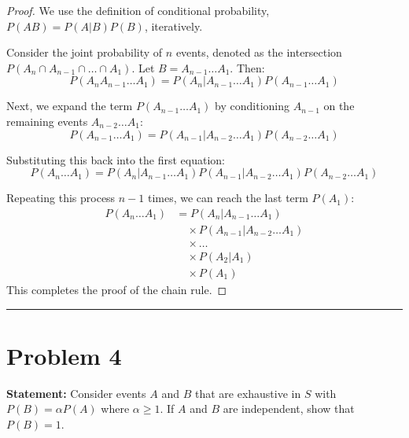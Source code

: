 \documentclass{article}
\begin{document}
\begin{proof}
	We use the definition of conditional probability, $P(AB) = P(A|B)P(B)$, iteratively.

	Consider the joint probability of $n$ events, denoted as the intersection $P(A_n \cap A_{n-1} \cap \dots \cap A_1)$.
	Let $B = A_{n-1} \dots A_1$. Then:
	\[ P(A_n A_{n-1} \dots A_1) = P(A_n | A_{n-1} \dots A_1) P(A_{n-1} \dots A_1) \]

	Next, we expand the term $P(A_{n-1} \dots A_1)$ by conditioning $A_{n-1}$ on the remaining events $A_{n-2} \dots A_1$:
	\[ P(A_{n-1} \dots A_1) = P(A_{n-1} | A_{n-2} \dots A_1) P(A_{n-2} \dots A_1) \]

	Substituting this back into the first equation:
	\[ P(A_n \dots A_1) = P(A_n | A_{n-1} \dots A_1) P(A_{n-1} | A_{n-2} \dots A_1) P(A_{n-2} \dots A_1) \]

	Repeating this process $n-1$ times, we can reach the last term $P(A_1)$:
	\begin{align*}
		P(A_n \dots A_1) & = P(A_n | A_{n-1} \dots A_1)                \\
		                 & \quad \times P(A_{n-1} | A_{n-2} \dots A_1) \\
		                 & \quad \times \dots                          \\
		                 & \quad \times P(A_2 | A_1)                   \\
		                 & \quad \times P(A_1)
	\end{align*}
	This completes the proof of the chain rule.
\end{proof}

\vspace{1cm}
\hrule
\vspace{1cm}

\section*{Problem 4}
\textbf{Statement:} Consider events $A$ and $B$ that are exhaustive in $S$ with $P(B) = \alpha P(A)$ where $\alpha \ge 1$. If $A$ and $B$ are independent, show that $P(B) = 1$.
\end{document}
